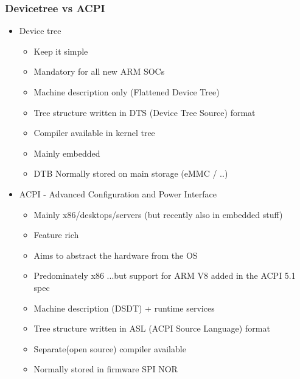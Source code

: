 \documentclass{beamer}
\begin{document}
\begin{frame}
\frametitle{Devicetree vs ACPI}
\begin{itemize}
	\item Device tree
	\begin{itemize}	
		\tiny
		\item Keep it simple
		\item Mandatory for all new ARM SOCs 
		\item Machine description only (Flattened Device Tree)
		\item Tree structure written in DTS (Device Tree Source) format
		\item Compiler available in kernel tree
		\item Mainly embedded
		\item DTB Normally stored on main storage (eMMC / ..)
	\end{itemize}
	\item ACPI - Advanced Configuration and Power Interface
	\begin{itemize}
		\tiny
		\item Mainly x86/desktops/servers (but recently also in embedded stuff) 
		\item Feature rich 
		\item Aims to abstract the hardware from the OS
		\item Predominately x86 ...but support for ARM V8 added in the ACPI 5.1 spec
		\item Machine description (DSDT) + runtime services
		\item Tree structure written in ASL  (ACPI Source Language) format
		\item Separate(open source) compiler available
		\item Normally stored in firmware SPI NOR
	\end{itemize}
\end{itemize}
\end{frame}
\end{document}
